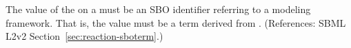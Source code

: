 The value of the   on a \Reaction must be an SBO
identifier referring to a modeling framework.  That is, the value must
be a term derived from \sboevent.  (References: SBML L2v2
Section~\ref{sec:reaction-sboterm}.)
